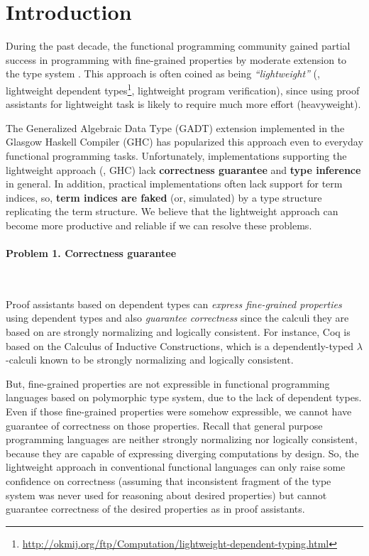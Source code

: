 \section{Introduction}
During the past decade, the functional programming community gained
partial success in programming with fine-grained properties
by moderate extension to the type system \cite{CheHin03,CheHin02,Xi03}.
This approach is often coined as being \emph{``lightweight''}
(\eg, lightweight dependent types\footnote{
  \url{http://okmij.org/ftp/Computation/lightweight-dependent-typing.html} },
  lightweight program verification),
since using proof assistants for lightweight task is likely to require
much more effort (heavyweight).

The Generalized Algebraic Data Type (GADT) extension implemented
in the Glasgow Haskell Compiler (GHC) has popularized this approach
even to everyday functional programming tasks.
%
Unfortunately, implementations supporting the lightweight approach (\eg, GHC)
lack \textbf{correctness guarantee} and \textbf{type inference} in general.
In addition, practical implementations often lack support for term indices,
so, \textbf{term indices are faked} (or, simulated) by a type structure
replicating the term structure. We believe that the lightweight approach can
become more productive and reliable if we can resolve these problems.

\paragraph{Problem 1. \textbf{Correctness guarantee}} ~

Proof assistants based on dependent types can
\emph{express fine-grained properties} using dependent types and
also \emph{guarantee correctness} since the calculi they are based on
are strongly normalizing and logically consistent. For instance, Coq is
based on the Calculus of Inductive Constructions, which is a dependently-typed
$\lambda$-calculi known to be strongly normalizing and logically consistent.
 
But, fine-grained properties are not expressible in functional programming
languages based on polymorphic type system, due to the lack of dependent types.
Even if those fine-grained properties were somehow expressible, we cannot have
guarantee of correctness on those properties. Recall that general purpose
programming languages are neither strongly normalizing nor logically consistent,
because they are capable of expressing diverging computations by design.
So, the lightweight approach in conventional functional languages can only
raise some confidence on correctness (assuming that inconsistent fragment of
the type system was never used for reasoning about desired properties) 
but cannot guarantee correctness of the desired properties as
in proof assistants.

